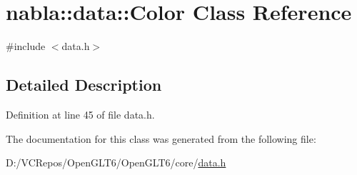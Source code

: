 \hypertarget{classnabla_1_1data_1_1_color}{}\section{nabla\+::data\+::Color Class Reference}
\label{classnabla_1_1data_1_1_color}


{\ttfamily \#include $<$data.\+h$>$}



\subsection{Detailed Description}


Definition at line 45 of file data.\+h.



The documentation for this class was generated from the following file\+:\begin{DoxyCompactItemize}
\item 
D\+:/\+V\+C\+Repos/\+Open\+G\+L\+T6/\+Open\+G\+L\+T6/core/\mbox{\hyperlink{data_8h}{data.\+h}}\end{DoxyCompactItemize}
